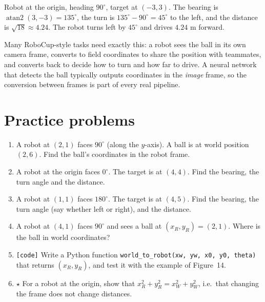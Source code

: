 \begin{example}
Robot at the origin, heading $90^\circ$, target at $(-3,3)$. The bearing is $\operatorname{atan2}(3,-3)=135^\circ$, the turn is $135^\circ-90^\circ=45^\circ$ to the left, and the distance is $\sqrt{18}\approx4.24$. The robot turns left by $45^\circ$ and drives $4.24$ m forward.
\end{example}

\begin{aibox}
Many RoboCup-style tasks need exactly this: a robot sees the ball in its own camera frame, converts to field coordinates to share the position with teammates, and converts back to decide how to turn and how far to drive. A neural network that detects the ball typically outputs coordinates in the \emph{image} frame, so the conversion between frames is part of every real pipeline.
\end{aibox}

\section*{Practice problems}
\begin{enumerate}[label=\textbf{\thechapter.\arabic*}]
  \item A robot at $(2,1)$ faces $90^\circ$ (along the $y$-axis). A ball is at world position $(2,6)$. Find the ball's coordinates in the robot frame.
  \item A robot at the origin faces $0^\circ$. The target is at $(4,4)$. Find the bearing, the turn angle and the distance.
  \item A robot at $(1,1)$ faces $180^\circ$. The target is at $(4,5)$. Find the bearing, the turn angle (say whether left or right), and the distance.
  \item A robot at $(4,1)$ faces $90^\circ$ and sees a ball at $(x_R,y_R)=(2,1)$. Where is the ball in world coordinates?
  \item \texttt{[code]} Write a Python function \texttt{world\_to\_robot(xw, yw, x0, y0, theta)} that returns $(x_R,y_R)$, and test it with the example of Figure~14.
  \item $\star$ For a robot at the origin, show that $x_R^2+y_R^2=x_W^2+y_W^2$, i.e.\ that changing the frame does not change distances.
\end{enumerate}

\newpage
